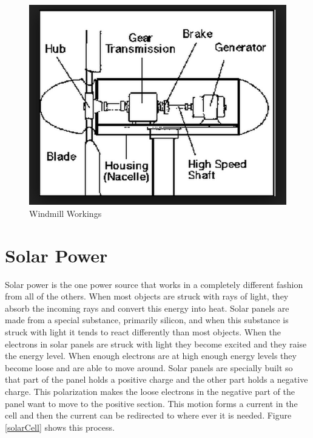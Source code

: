 \documentclass[msc,oneside]{ubcthesis}%
\begin{document}
\begin{figure}[hbt]\label{windmillWorkings}
  \begin{center}
    \includegraphics[width=1\textwidth]{windmill}
    \caption[Windmill Workings]{Windmill Workings }
  \end{center}
\end{figure}

\newpage

\section{Solar Power}
Solar power is the one power source that works in a completely different fashion from all of the others. When most objects are struck with rays of light, they absorb the incoming rays and convert this energy into heat. Solar panels are made from a special substance, primarily silicon, and when this substance is struck with light it tends to react differently than most objects. When the electrons in solar panels are 
struck with light they become excited and they raise the energy level. When enough electrons are at high enough energy levels they become loose and are able to move around. Solar panels are specially built so that part of the panel holds a positive charge and the other part holds a negative charge. This polarization makes the loose electrons in the negative part of the panel want to move to the positive section. This motion forms a current in the cell and then the current can be redirected to where ever it is needed. Figure 
\ref{solarCell} shows this process. 
\end{document}
